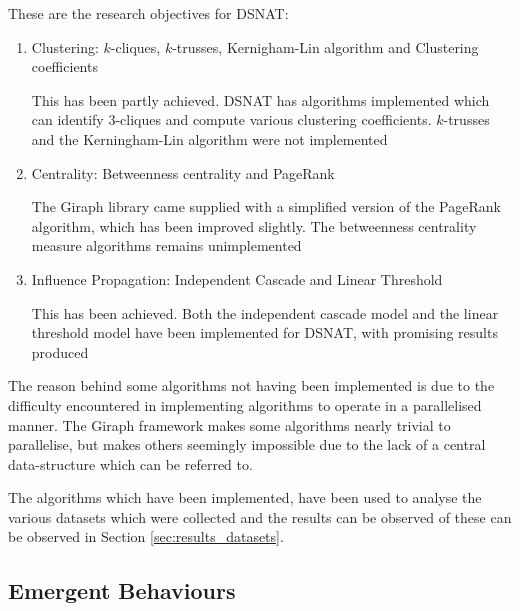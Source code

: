 These are the research objectives for DSNAT:

\begin{enumerate}
	\item Clustering: $k$-cliques, $k$-trusses, Kernigham-Lin algorithm and Clustering coefficients
	
	This has been partly achieved. DSNAT has algorithms implemented which can identify 3-cliques and compute various clustering coefficients. $k$-trusses and the Kerningham-Lin algorithm were not implemented
	
	\item Centrality: Betweenness centrality and PageRank
	
	The Giraph library came supplied with a simplified version of the PageRank algorithm, which has been improved slightly. The betweenness centrality measure algorithms remains unimplemented
	\item Influence Propagation: Independent Cascade and Linear Threshold
	
	This has been achieved. Both the independent cascade model and the linear threshold model have been implemented for DSNAT, with promising results produced
\end{enumerate}

The reason behind some algorithms not having been implemented is due to the difficulty encountered in implementing algorithms to operate in a parallelised manner. The Giraph framework makes some algorithms nearly trivial to parallelise, but makes others seemingly impossible due to the lack of a central data-structure which can be referred to.

The algorithms which have been implemented, have been used to analyse the various datasets which were collected and the results can be observed of these can be observed in Section \ref{sec:results_datasets}.

\subsection{Emergent Behaviours}

